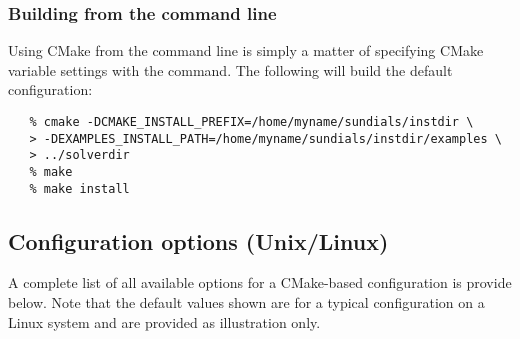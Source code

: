 


\subsubsection*{Building from the command line}

Using CMake from the command line is simply a matter of specifying CMake variable settings
with the  command.  The following will build the default configuration:

\begin{verbatim}
   % cmake -DCMAKE_INSTALL_PREFIX=/home/myname/sundials/instdir \
   > -DEXAMPLES_INSTALL_PATH=/home/myname/sundials/instdir/examples \
   > ../solverdir
   % make
   % make install
\end{verbatim}


\subsection{Configuration options (Unix/Linux)}\label{ss:configuration_options_nix}

A complete list of all available options for a CMake-based {\sundials}
configuration is provide below. Note that the default values shown are for
a typical configuration on a Linux system and are provided as illustration only.

